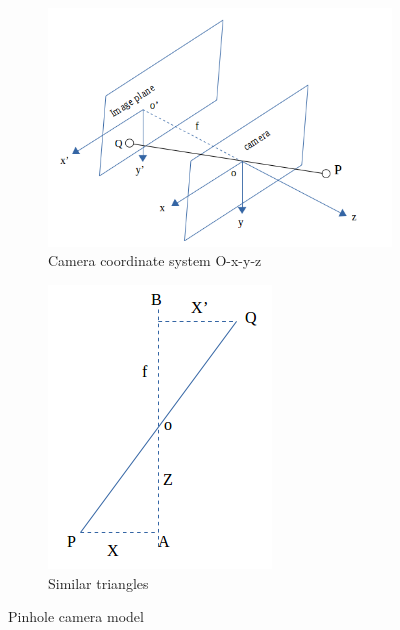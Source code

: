 \begin{figure}[h!]
  \centering
  \begin{subfigure}[b]{0.6\linewidth}
    \includegraphics[width=\linewidth]{./fig/pinhole_camera.png}
    \caption{Camera coordinate system O-x-y-z}
  \end{subfigure}
  \begin{subfigure}[b]{0.3\linewidth}
    \includegraphics[width=\linewidth]{./fig/similar_triangles.png}
    \caption{Similar triangles}
  \end{subfigure}
  \caption{Pinhole camera model}
  \label{fig:pinhole_camera_model}
\end{figure}

